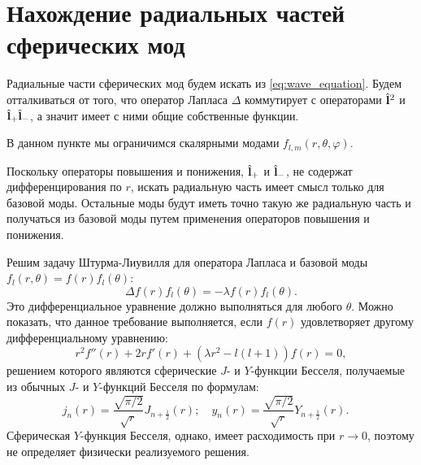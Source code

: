 \documentclass[12pt,a4paper]{article}
\begin{document}

    \section{Нахождение радиальных частей сферических мод}

        Радиальные части сферических мод будем искать из \autoref{eq:wave_equation}. Будем отталкиваться от того, что оператор Лапласа $\Delta$ коммутирует с операторами $\hat{\mathbf{l}}^2$ и $\hat{\mathbf{l}}_{+} \hat{\mathbf{l}}_{-}$, а значит имеет с ними общие собственные функции.

        В данном пункте мы ограничимся скалярными модами $f_{l,m}(r,\theta,\varphi)$.

        Поскольку операторы повышения и понижения, $\hat{\mathbf{l}}_{+}$ и $\hat{\mathbf{l}}_{-}$, не содержат дифференцирования по $r$, искать радиальную часть имеет смысл только для базовой моды. Остальные моды будут иметь точно такую же радиальную часть и получаться из базовой моды путем применения операторов повышения и понижения.

        Решим задачу Штурма-Лиувилля для оператора Лапласа и базовой моды $f_{l}(r,\theta) = f(r) f_{l}(\theta)$:
        \begin{equation}
            \Delta f(r) f_{l}(\theta) = - \lambda f(r) f_{l}(\theta) .
        \end{equation}
        Это дифференциальное уравнение должно выполняться для любого $\theta$. Можно показать, что данное требование выполняется, если $f(r)$ удовлетворяет другому дифференциальному уравнению:
        \begin{equation}
            r^2 f''(r) + 2 r f'(r) + (\lambda r^2 - l(l+1)) f(r) = 0 ,
        \end{equation}
        решением которого являются сферические $J$- и $Y$-функции Бесселя, получаемые из обычных $J$- и $Y$-функций Бесселя по формулам:
        \begin{equation}
            j_n(r) = \frac{\sqrt{\pi/2}}{\sqrt{r}} J_{n+\frac{1}{2}}(r) ; \quad
            y_n(r) = \frac{\sqrt{\pi/2}}{\sqrt{r}} Y_{n+\frac{1}{2}}(r) . \quad
        \end{equation}
        Сферическая $Y$-функция Бесселя, однако, имеет расходимость при $r \to 0$, поэтому не определяет физически реализуемого решения.
\end{document}
